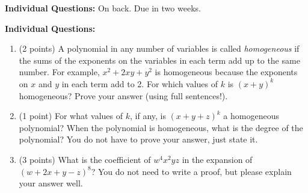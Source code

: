 \documentclass{article}
\begin{document}
\vspace{0.5in} 

\noindent\textbf{Individual Questions:} On back. Due in two weeks.

\newpage

\noindent\textbf{Individual Questions:} 

\begin{enumerate}

\item (2 points)  A polynomial in any number of variables is called \textit{homogeneous} if the sums of the exponents on the variables in each term add up to the same number. For example, $x^2+2xy+y^2$ is homogeneous because the exponents on $x$ and $y$ in each term add to 2. For which values of $k$ is $(x+y)^k$ homogeneous? Prove your answer (using full sentences!).

\vspace{0.2in}

\item (1 point) For what values of $k$, if any, is $(x+y+z)^k$ a homogeneous polynomial? When the polynomial is homogeneous, what is the degree of the polynomial? You do not have to prove your answer, just state it.

\vspace{0.2in}

\item (3 points) What is the coefficient of $w^4x^2yz$ in the expansion of $(w+2x+y-z)^8$? You do not need to write a proof, but please explain your answer well.

\end{enumerate}
\end{document}
